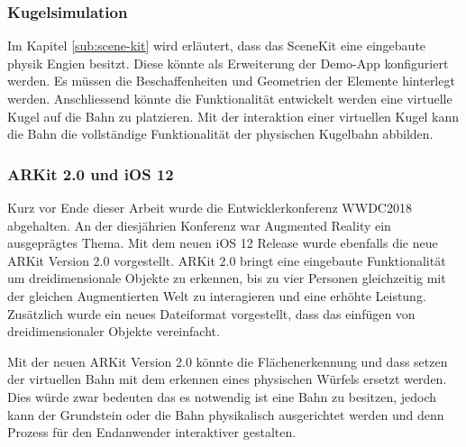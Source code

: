 \subsubsection{Kugelsimulation}
Im Kapitel \ref{sub:scene-kit} wird erläutert, dass das SceneKit eine eingebaute physik Engien besitzt. Diese könnte als Erweiterung der Demo-App konfiguriert werden. Es müssen die Beschaffenheiten und Geometrien der Elemente hinterlegt werden. Anschliessend könnte die Funktionalität entwickelt werden eine virtuelle Kugel auf die Bahn zu platzieren. Mit der interaktion einer virtuellen Kugel kann die Bahn die vollständige Funktionalität der physischen Kugelbahn abbilden.

\subsubsection{ARKit 2.0 und iOS 12}
Kurz vor Ende dieser Arbeit wurde die Entwicklerkonferenz WWDC2018 abgehalten. An der diesjährien Konferenz war Augmented Reality ein ausgeprägtes Thema. Mit dem neuen iOS 12 Release wurde ebenfalls die neue ARKit Version 2.0 vorgestellt. ARKit 2.0 bringt eine eingebaute Funktionalität um dreidimensionale Objekte zu erkennen, bis zu vier Personen gleichzeitig mit der gleichen Augmentierten Welt zu interagieren und eine erhöhte Leistung. Zusätzlich wurde ein neues Dateiformat vorgestellt, dass das einfügen von dreidimensionaler Objekte vereinfacht. 

Mit der neuen ARKit Version 2.0 könnte die Flächenerkennung und dass setzen der virtuellen Bahn mit dem erkennen eines physischen Würfels ersetzt werden. Dies würde zwar bedeuten das es notwendig ist eine Bahn zu besitzen, jedoch kann der Grundstein oder die Bahn physikalisch ausgerichtet werden und denn Prozess für den Endanwender interaktiver gestalten.
